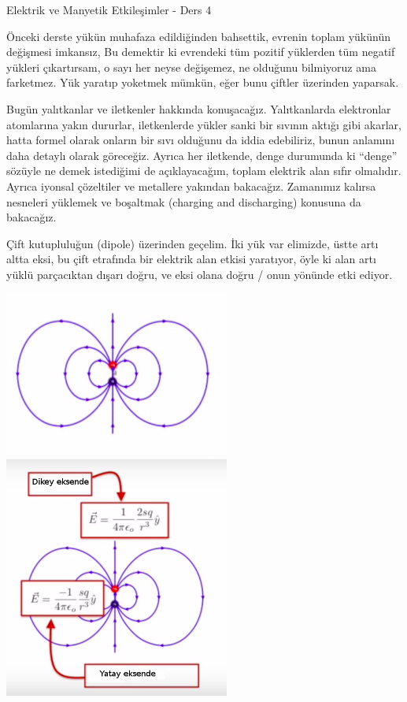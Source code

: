 \documentclass[12pt,fleqn]{article}\usepackage{../../common}
\begin{document}
Elektrik ve Manyetik Etkileşimler - Ders 4

Önceki derste yükün muhafaza edildiğinden bahsettik, evrenin toplam yükünün
değişmesi imkansız, Bu demektir ki evrendeki tüm pozitif yüklerden tüm negatif
yükleri çıkartırsam, o sayı her neyse değişemez, ne olduğunu bilmiyoruz ama
farketmez. Yük yaratıp yoketmek mümkün, eğer bunu çiftler üzerinden yaparsak.

Bugün yalıtkanlar ve iletkenler hakkında konuşacağız. Yalıtkanlarda elektronlar
atomlarına yakın dururlar, iletkenlerde yükler sanki bir sıvının aktığı gibi
akarlar, hatta formel olarak onların bir sıvı olduğunu da iddia edebiliriz,
bunun anlamını daha detaylı olarak göreceğiz. Ayrıca her iletkende, denge
durumunda ki ``denge'' sözüyle ne demek istediğimi de açıklayacağım, toplam
elektrik alan sıfır olmalıdır. Ayrıca iyonsal çözeltiler ve metallere yakından
bakacağız. Zamanımız kalırsa nesneleri yüklemek ve boşaltmak (charging and
discharging) konusuna da bakacağız. 

Çift kutupluluğun (dipole) üzerinden geçelim. İki yük var elimizde, üstte artı
altta eksi, bu çift etrafında bir elektrik alan etkisi yaratıyor, öyle ki alan
artı yüklü parçacıktan dışarı doğru, ve eksi olana doğru / onun yönünde etki
ediyor. 

\includegraphics[width=20em]{04_01.png}
\includegraphics[width=20em]{04_02.png}
\end{document}

